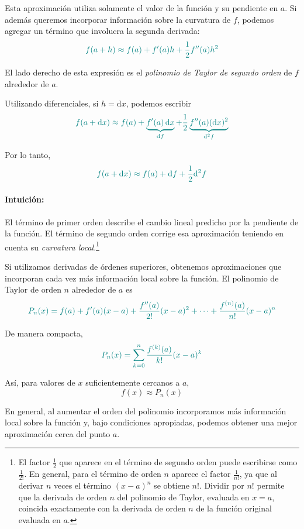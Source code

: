 \documentclass{article}
\begin{document}
Esta aproximación utiliza solamente el valor de la función y su pendiente en \(a\).
Si además queremos incorporar información sobre la curvatura de \(f\), podemos agregar un término que involucra la segunda derivada:
\[
\color{teal}
f(a+h)
\approx
f(a)
+
f'(a)h
+
\frac{1}{2}f''(a)h^2
\]

El lado derecho de esta expresión es el \emph{polinomio de Taylor de segundo orden} de \(f\) alrededor de \(a\).

Utilizando diferenciales, si \(h=\mathrm{d}x\), podemos escribir
\[
\color{teal}
f(a+\mathrm{d}x)
\approx
f(a)
+
\underbrace{f'(a)\,\mathrm{d}x}_{\mathrm{d}f}
+
\frac{1}{2}
\underbrace{f''(a)(\mathrm{d}x)^2}_{\mathrm{d}^2f}
\]

Por lo tanto,
\[
\color{teal}
f(a+\mathrm{d}x)
\approx
f(a)
+
\mathrm{d}f
+
\frac{1}{2}\mathrm{d}^2f
\]

\paragraph*{Intuición:}
El término de primer orden describe el cambio lineal predicho por la pendiente de la función.
El término de segundo orden corrige esa aproximación teniendo en cuenta su \emph{curvatura local}.\footnote{El factor \(\tfrac{1}{2}\) que aparece en el término de segundo orden puede escribirse como \(\tfrac{1}{2!}\). En general, para el término de orden \(n\) aparece el factor \(\tfrac{1}{n!}\), ya que al derivar \(n\) veces el término \((x-a)^n\) se obtiene \(n!\). Dividir por \(n!\) permite que la derivada de orden \(n\) del polinomio de Taylor, evaluada en \(x=a\), coincida exactamente con la derivada de orden \(n\) de la función original evaluada en \(a\).}

Si utilizamos derivadas de órdenes superiores, obtenemos aproximaciones que incorporan cada vez más información local sobre la función.
El polinomio de Taylor de orden \(n\) alrededor de \(a\) es
\[
\color{teal}
P_n(x)
=
f(a)
+
f'(a)(x-a)
+
\frac{f''(a)}{2!}(x-a)^2
+
\cdots
+
\frac{f^{(n)}(a)}{n!}(x-a)^n
\]

De manera compacta,
\[
\color{teal}
P_n(x)
=
\sum_{k=0}^{n}
\frac{f^{(k)}(a)}{k!}(x-a)^k
\]

Así, para valores de \(x\) suficientemente cercanos a \(a\),
\[
f(x)\approx P_n(x)
\]

En general, al aumentar el orden del polinomio incorporamos más información local sobre la función y, bajo condiciones apropiadas, podemos obtener una mejor aproximación cerca del punto \(a\).
\end{document}
